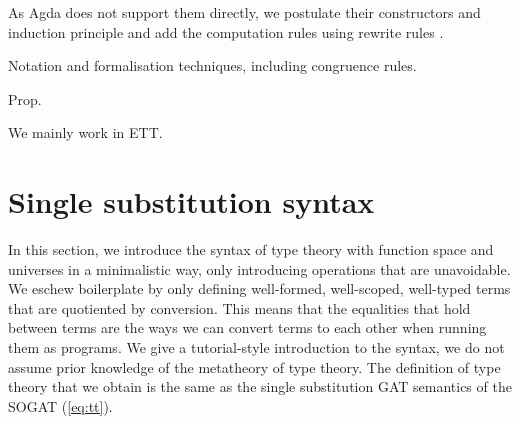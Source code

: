\documentclass[sigplan,10pt,anonymous,review]{acmart}\settopmatter{printfolios=true,printccs=false,printacmref=false}
\begin{document}
As Agda does not support them directly, we postulate their
constructors and induction principle and add the computation rules
using rewrite rules \cite{DBLP:conf/types/Cockx19}.

Notation and formalisation techniques, including congruence rules.

Prop.

We mainly work in ETT.

\section{Single substitution syntax}
\label{sec:tt}

In this section, we introduce the syntax of type theory with function
space and universes in a minimalistic way, only introducing operations
that are unavoidable. We eschew boilerplate by only defining
well-formed, well-scoped, well-typed terms that are quotiented by
conversion. This means that the equalities that hold between terms are
the ways we can convert terms to each other when running them as
programs. We give a tutorial-style introduction to the syntax, we do
not assume prior knowledge of the metatheory of type theory. The
definition of type theory that we obtain is the same as the single
substitution GAT semantics \cite{DBLP:conf/fscd/KaposiX24} of the
SOGAT (\ref{eq:tt}).
\end{document}
